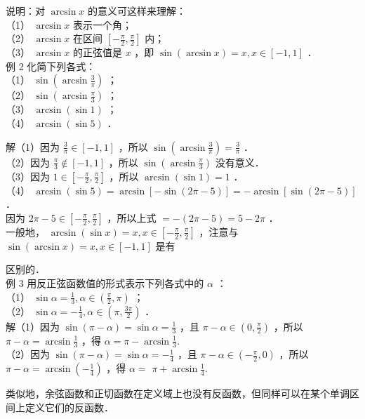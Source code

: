 \documentclass[10pt]{article}
\begin{document}
说明：对 \(\arcsin x\) 的意义可这样来理解：\\
（1） \(\arcsin x\) 表示一个角；\\
（2） \(\arcsin x\) 在区间 \(\left[-\frac{\pi}{2}, \frac{\pi}{2}\right]\) 内；\\
（3） \(\arcsin x\) 的正弦值是 \(x\) ，即 \(\sin (\arcsin x)=x, x \in[-1,1]\) ．\\
例 2 化简下列各式：\\
（1） \(\sin \left(\arcsin \frac{3}{\pi}\right)\) ；\\
（2） \(\sin \left(\arcsin \frac{\pi}{3}\right)\) ；\\
（3） \(\arcsin (\sin 1)\) ；\\
（4） \(\arcsin (\sin 5)\) ．

解（1）因为 \(\frac{3}{\pi} \in[-1,1]\) ，所以 \(\sin \left(\arcsin \frac{3}{\pi}\right)=\frac{3}{\pi}\) ．\\
（2）因为 \(\frac{\pi}{3} \notin[-1,1]\) ，所以 \(\sin \left(\arcsin \frac{\pi}{3}\right)\) 没有意义．\\
（3）因为 \(1 \in\left[-\frac{\pi}{2}, \frac{\pi}{2}\right]\) ，所以 \(\arcsin (\sin 1)=1\) ．\\
（4） \(\arcsin (\sin 5)=\arcsin [-\sin (2 \pi-5)]=-\arcsin [\sin (2 \pi-5)]\) ．\\
因为 \(2 \pi-5 \in\left[-\frac{\pi}{2}, \frac{\pi}{2}\right]\) ，所以上式 \(=-(2 \pi-5)=5-2 \pi\) ．\\
一般地， \(\arcsin (\sin x)=x, x \in\left[-\frac{\pi}{2}, \frac{\pi}{2}\right]\) ，注意与 \(\sin (\arcsin x)=x, x \in[-1,1]\) 是有

区别的．\\
例 3 用反正弦函数值的形式表示下列各式中的 \(\alpha\) ：\\
（1） \(\sin \alpha=\frac{1}{3}, \alpha \in\left(\frac{\pi}{2}, \pi\right)\) ；\\
（2） \(\sin \alpha=-\frac{1}{4}, \alpha \in\left(\pi, \frac{3 \pi}{2}\right)\) ．\\
解（1）因为 \(\sin (\pi-\alpha)=\sin \alpha=\frac{1}{3}\) ，且 \(\pi-\alpha \in\left(0, \frac{\pi}{2}\right)\) ，所以 \(\pi-\alpha=\arcsin \frac{1}{3}\) ，得 \(\alpha=\pi-\arcsin \frac{1}{3}\).\\
（2）因为 \(\sin (\pi-\alpha)=\sin \alpha=-\frac{1}{4}\) ，且 \(\pi-\alpha \in\left(-\frac{\pi}{2}, 0\right)\) ，所以 \(\pi-\alpha=\arcsin \left(-\frac{1}{4}\right)\) ，得 \(\alpha=\) \(\pi+\arcsin \frac{1}{4}\).

类似地，余弦函数和正切函数在定义域上也没有反函数，但同样可以在某个单调区间上定义它们的反函数．
\end{document}
